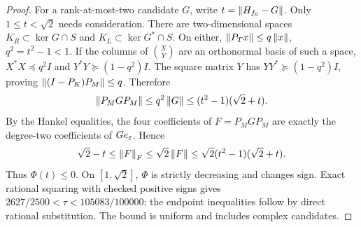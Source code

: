 \begin{proof}
For a rank-at-most-two candidate $G$, write $t=\left\lVert H_{f_0}-G\right\rVert$. Only $1\le t<\sqrt2$ needs consideration. There are two-dimensional spaces $K_R\subset\ker G\cap S$ and $K_L\subset\ker G^*\cap S$. On either, $\left\lVert P_Tx\right\rVert\le q\left\lVert x\right\rVert$, $q^2=t^2-1<1$. If the columns of $\binom XY$ are an orthonormal basis of such a space, $X^*X\preceq q^2I$ and $Y^*Y\succeq(1-q^2)I$. The square matrix $Y$ has $YY^*\succeq(1-q^2)I$, proving $\left\lVert(I-P_K)P_M\right\rVert\le q$. Therefore
\[
 \left\lVert P_MGP_M\right\rVert\le q^2\left\lVert G\right\rVert\le(t^2-1)(\sqrt2+t).
\]
By the Hankel equalities, the four coefficients of $F=P_MGP_M$ are exactly the degree-two coefficients of $Ge_\varepsilon$. Hence
\[
 \sqrt2-t\le\left\lVert F\right\rVert_F\le\sqrt2\left\lVert F\right\rVert
 \le\sqrt2(t^2-1)(\sqrt2+t).
\]
Thus $\Phi(t)\le0$. On $[1,\sqrt2]$, $\Phi$ is strictly decreasing and changes sign. Exact rational squaring with checked positive signs gives
$2627/2500<\tau<105083/100000$; the endpoint inequalities follow by direct rational substitution. The bound is uniform and includes complex candidates.
\end{proof}
